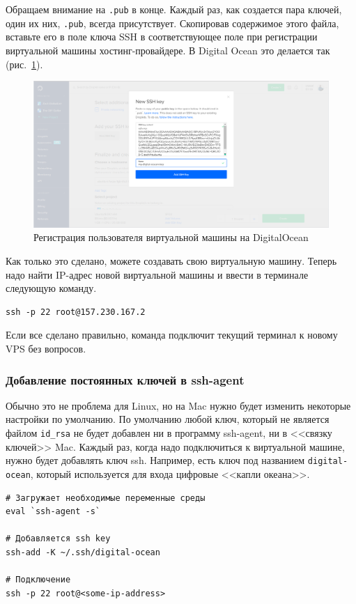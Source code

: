 \documentclass[12pt]{article}
\begin{document}
Обращаем внимание на \texttt{.pub} в конце. Каждый раз, как создается
пара ключей, один их них, \texttt{.pub}, всегда присутствует. Скопировав
содержимое этого файла, вставьте его в поле ключа SSH в соответствующее
поле при регистрации виртуальной машины хостинг-провайдере. В Digital
Ocean это делается так (рис.~\ref{fig:userreg}).

\begin{figure}[tbh]
  \centering
  \includegraphics[width=0.9\linewidth]{blog/2019/bash-essentials/digital-ocean-key.png}

  \caption{Регистрация пользователя виртуальной машины на DigitalOcean}
  \label{fig:userreg}
\end{figure}
Как только это сделано, можете создавать свою виртуальную машину. Теперь
надо найти IP-адрес новой виртуальной машины и ввести в терминале
следующую команду.
\begin{verbatim}
ssh -p 22 root@157.230.167.2
\end{verbatim}
Если все сделано правильно, команда подключит текущий терминал к новому VPS без вопросов.

\hypertarget{Permanently-Add-Keys-to-ssh-agent}{%
\subsubsection{\texorpdfstring{\protect\hyperlink{Permanently-Add-Keys-to-ssh-agent}{}Добавление
постоянных ключей в
ssh-agent}{Добавление постоянных ключей в ssh-agent}}\label{Permanently-Add-Keys-to-ssh-agent}}

Обычно это не проблема для Linux, но на Mac нужно будет изменить
некоторые настройки по умолчанию. По умолчанию любой ключ, который не
является файлом \texttt{id\_rsa} не будет добавлен ни в программу
ssh-agent, ни в <<связку ключей>> Mac. Каждый раз, когда надо подключиться
к виртуальной машине, нужно будет добавлять ключ ssh. Например, есть
ключ под названием \texttt{digital-ocean}, который используется для
входа цифровые <<капли океана>>.
\begin{verbatim}
# Загружает необходимые переменные среды
eval `ssh-agent -s`

# Добавляется ssh key
ssh-add -K ~/.ssh/digital-ocean

# Подключение
ssh -p 22 root@<some-ip-address>
\end{verbatim}
\end{document}
